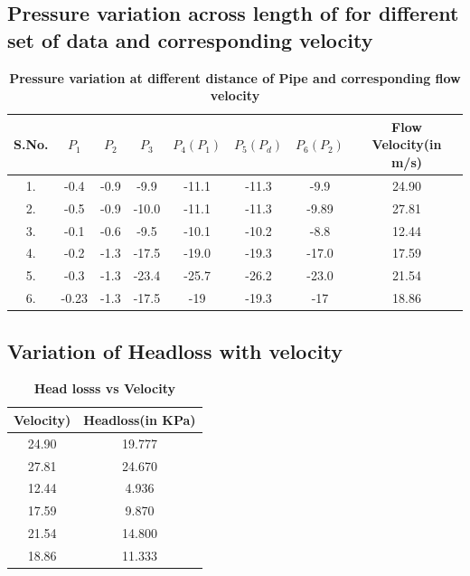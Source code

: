\documentclass[12pt,a4paper]{article}
\begin{document}
\subsection{Pressure variation across length of for different set of data and corresponding velocity}
\begin{table}[ht]
\centering
\caption{\textbf{Pressure variation at different distance of Pipe and corresponding flow velocity}}
\vspace{2mm}
\begin{tabular}{ |c|c|c|c|c|c|c|c| } 
 \hline
 \textbf{S.No.} & $P_1$ & $P_2$ & $P_3$ & $P_4(P_1)$ & $P_5(P_d)$ & $P_6(P_2)$ & \textbf{{Flow Velocity(in m/s)}}\\ [0.5ex] 
 \hline
 1. & -0.4 & -0.9 & -9.9 & -11.1 & -11.3 & -9.9 & 24.90 \\ 
 \hline
 2. & -0.5 & -0.9 & -10.0 & -11.1 & -11.3 & -9.89 & 27.81 \\
 \hline
 3. & -0.1 & -0.6 & -9.5 & -10.1 & -10.2 & -8.8 & 12.44 \\
 \hline
 4. & -0.2 & -1.3 & -17.5 & -19.0 & -19.3 & -17.0 & 17.59 \\
 \hline
 5. & -0.3 & -1.3 & -23.4 & -25.7 & -26.2 & -23.0 & 21.54\\ 
 \hline
 6. & -0.23 & -1.3 & -17.5 & -19 & -19.3 & -17 & 18.86 \\
 \hline
 
\end{tabular}
\end{table}

\newpage
\subsection{Variation of Headloss with velocity}
\begin{table}[ht]
 \centering
 \caption{\textbf{Head losss vs Velocity}}
\vspace{2mm}
\begin{tabular}{ |c|c| } 
 \hline
 \textbf{Velocity)} & \textbf{Headloss(in KPa)}  \\ 
 \hline
  24.90 & 19.777 \\ 
 \hline
  27.81 & 24.670 \\ 
 \hline
 12.44 & 4.936 \\ 
 \hline
 17.59 & 9.870 \\
  \hline
 21.54 & 14.800 \\ 
 \hline 
18.86 & 11.333 \\
 \hline
\end{tabular}
\end{table}
\end{document}
